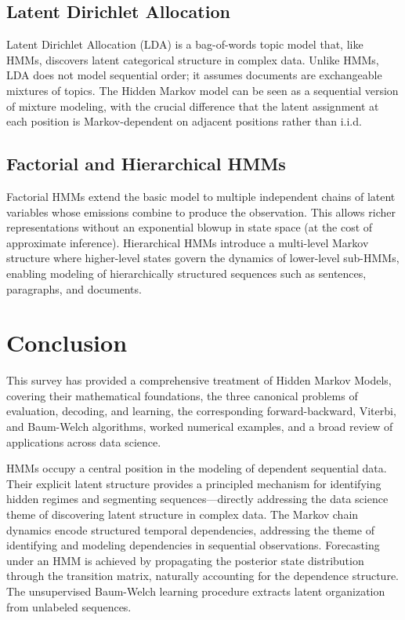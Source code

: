 \documentclass[conference]{IEEEtran}
\begin{document}
\subsection{Latent Dirichlet Allocation}

Latent Dirichlet Allocation (LDA) \cite{blei2003latent} is a bag-of-words topic model that, like HMMs, discovers latent categorical structure in complex data. Unlike HMMs, LDA does not model sequential order; it assumes documents are exchangeable mixtures of topics. The Hidden Markov model can be seen as a sequential version of mixture modeling, with the crucial difference that the latent assignment at each position is Markov-dependent on adjacent positions rather than i.i.d.

\subsection{Factorial and Hierarchical HMMs}

Factorial HMMs \cite{ghahramani1996factorial} extend the basic model to multiple independent chains of latent variables whose emissions combine to produce the observation. This allows richer representations without an exponential blowup in state space (at the cost of approximate inference). Hierarchical HMMs \cite{fine1998hierarchical} introduce a multi-level Markov structure where higher-level states govern the dynamics of lower-level sub-HMMs, enabling modeling of hierarchically structured sequences such as sentences, paragraphs, and documents.

\section{Conclusion}
\label{sec:conclusion}

This survey has provided a comprehensive treatment of Hidden Markov Models, covering their mathematical foundations, the three canonical problems of evaluation, decoding, and learning, the corresponding forward-backward, Viterbi, and Baum-Welch algorithms, worked numerical examples, and a broad review of applications across data science.

HMMs occupy a central position in the modeling of dependent sequential data. Their explicit latent structure provides a principled mechanism for identifying hidden regimes and segmenting sequences---directly addressing the data science theme of discovering latent structure in complex data. The Markov chain dynamics encode structured temporal dependencies, addressing the theme of identifying and modeling dependencies in sequential observations. Forecasting under an HMM is achieved by propagating the posterior state distribution through the transition matrix, naturally accounting for the dependence structure. The unsupervised Baum-Welch learning procedure extracts latent organization from unlabeled sequences.
\end{document}
